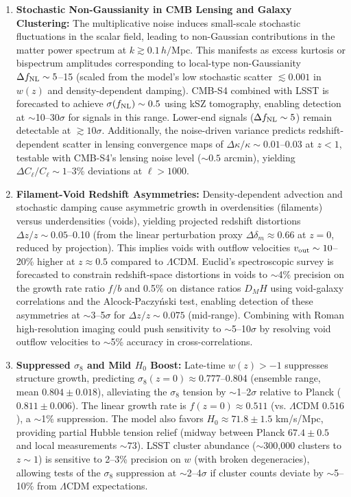 \documentclass[preprint]{aastex7}
\begin{document}
\begin{enumerate}
\item \textbf{Stochastic Non-Gaussianity in CMB Lensing and Galaxy Clustering:}  
The multiplicative noise induces small-scale stochastic fluctuations in the scalar field, leading to non-Gaussian contributions in the matter power spectrum at $k \gtrsim 0.1 \, h/$Mpc. This manifests as excess kurtosis or bispectrum amplitudes corresponding to local-type non-Gaussianity \( \Delta f_{\rm NL} \sim 5 \)--15 (scaled from the model's low stochastic scatter \( \lesssim 0.001 \) in \( w(z) \) and density-dependent damping). CMB-S4 combined with LSST is forecasted to achieve \( \sigma(f_{\rm NL}) \sim 0.5 \) using kSZ tomography, enabling detection at $\sim$10--30\( \sigma \) for signals in this range. Lower-end signals (\( \Delta f_{\rm NL} \sim 5 \)) remain detectable at \( \gtrsim 10\sigma \).  
Additionally, the noise-driven variance predicts redshift-dependent scatter in lensing convergence maps of \( \Delta \kappa / \kappa \sim 0.01 \)--0.03 at \( z < 1 \), testable with CMB-S4's lensing noise level (\( \sim 0.5 \) arcmin), yielding \( \Delta C_\ell / C_\ell \sim 1 \)--3\% deviations at \( \ell > 1000 \).

\item \textbf{Filament-Void Redshift Asymmetries:}  
Density-dependent advection and stochastic damping cause asymmetric growth in overdensities (filaments) versus underdensities (voids), yielding projected redshift distortions \( \Delta z/z \sim 0.05 \)--0.10 (from the linear perturbation proxy \( \Delta \delta_m \approx 0.66 \) at \( z=0 \), reduced by projection). This implies voids with outflow velocities \( v_{\rm out} \sim 10 \)--20\% higher at \( z \approx 0.5 \) compared to $\Lambda$CDM.  
Euclid's spectroscopic survey is forecasted to constrain redshift-space distortions in voids to $\sim$4\% precision on the growth rate ratio \( f/b \) and 0.5\% on distance ratios \( D_M H \) using void-galaxy correlations and the Alcock-Paczyński test, enabling detection of these asymmetries at $\sim$3--5\( \sigma \) for \( \Delta z/z \sim 0.075 \) (mid-range). Combining with Roman high-resolution imaging could push sensitivity to $\sim$5--10\( \sigma \) by resolving void outflow velocities to $\sim$5\% accuracy in cross-correlations.

\item \textbf{Suppressed \( \sigma_8 \) and Mild \( H_0 \) Boost:}  
Late-time \( w(z) > -1 \) suppresses structure growth, predicting \( \sigma_8(z=0) \approx 0.777 \)--0.804 (ensemble range, mean $0.804 \pm 0.018$), alleviating the \( \sigma_8 \) tension by $\sim$1--2\( \sigma \) relative to Planck ($0.811 \pm 0.006$). The linear growth rate is \( f(z=0) \approx 0.511 \) (vs. $\Lambda$CDM $0.516$), a $\sim$1\% suppression.  
The model also favors \( H_0 \approx 71.8 \pm 1.5 \) km/s/Mpc, providing partial Hubble tension relief (midway between Planck $67.4 \pm 0.5$ and local measurements \( \sim 73 \)). LSST cluster abundance ($\sim$300,000 clusters to \( z \sim 1 \)) is sensitive to 2--3\% precision on \( w \) (with broken degeneracies), allowing tests of the \( \sigma_8 \) suppression at $\sim$2--4\( \sigma \) if cluster counts deviate by $\sim$5--10\% from $\Lambda$CDM expectations.


\end{enumerate}
\end{document}
